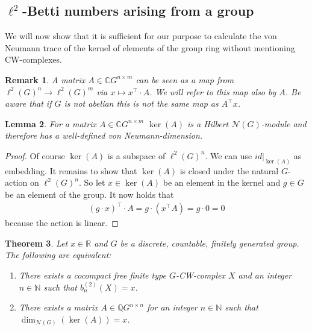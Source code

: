 \documentclass[12pt,a4paper]{scrartcl}
\theoremstyle{plain}
\newtheorem{Theorem}{Theorem}[section]
\newtheorem{Lemma}[Theorem]{Lemma}
\newtheorem{Remark}[Theorem]{Remark}
\theoremstyle{definition}
\numberwithin{equation}{section}
\newcommand{\C}{\mathbb{C}} %
\newcommand{\R}{\mathbb{R}} %
\newcommand{\Q}{\mathbb{Q}} %
\newcommand{\N}{\mathbb{N}} %
\newcommand{\2}{\mathbb{Z} / 2 \mathbb{Z}}
\newcommand{\1}{\bar{1}}
\newcommand{\0}{\bar{0}}
\begin{document}
\subsection{$\ell^2$-Betti numbers arising from a group}
We will now show that it is sufficient for our purpose to calculate the von Neumann trace of the kernel of elements of the group ring without mentioning CW-complexes.
\begin{Remark}\label{MAB}
	A matrix $A \in \C G^{n \times m}$ can be seen as a map from $\ell^2(G)^n \to \ell^2(G)^m$ via $x \mapsto x^{\top} \cdot A$. We will refer to this map also by $A$. Be aware that if $G$ is not abelian this is not the same map as $A^\top x$.
\end{Remark}
\begin{Lemma}
	For a matrix $A \in \C G^{n \times m}$ $\ker(A)$ is a Hilbert $\mathcal{N}(G)$-module and therefore has a well-defined von Neumann-dimension.
\end{Lemma}
\begin{proof}
	Of course $\ker(A)$ is a subspace of $\ell^2 (G)^n$. We can use $id|_{\ker(A)}$ as embedding. It remains to show that $\ker(A)$ is closed under the natural $G$-action on $\ell^2 (G)^n$. So let $x \in \ker(A)$ be an element in the kernel and $g \in G$ be an element of the group. It now holds that
	\begin{align*}
		(g \cdot x)^\top \cdot A = g \cdot (x^\top A) = g \cdot 0 = 0
	\end{align*}
	because the action is linear.
\end{proof}
\begin{Theorem} \label{MCW}
	Let $x \in \R$ and $G$ be a discrete, countable, finitely generated group. The following are equivalent:
	\begin{enumerate}
		\item There exists a cocompact free finite type $G$-CW-complex $X$ and an integer $n \in \N$ such that $b_n^{(2)}(X)=x$.
		\item There exists a matrix $A \in \Q G^{n \times n}$ for an integer $n \in \N$ such that \newline $\dim_{\mathcal{N}(G)}(\ker (A))=x$.
	\end{enumerate}
\end{Theorem}
\end{document}
